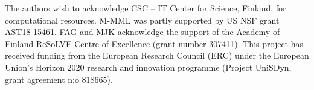 \documentclass[preprint2]{aastex63}
\begin{document}





\acknowledgments
The authors wish to acknowledge CSC – IT Center for Science, Finland, for computational
resources.
 M-MML was partly supported by US NSF grant AST18-15461.
 FAG and MJK acknowledge the support of the Academy of Finland
ReSoLVE Centre of Excellence (grant number 307411).
This project has received funding from the European Research Council (ERC)
under the European Union's Horizon 2020 research and innovation
programme (Project UniSDyn, grant agreement n:o 818665).

{}

\end{document}
